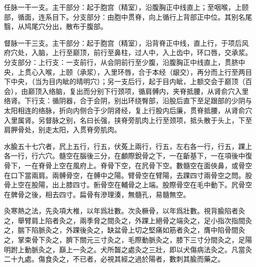 \documentclass[12pt]{ctexbook}%
\begin{document}
任脉一干一支。主干部分：起于胞宫（精室），沿腹胸正中线直上；至咽喉，上颐部，循面，连系目下。分支部分：由胞中贯脊，向上循行上背部正中位。其别名尾翳，从鸠尾穴分出，散布于腹部。

督脉一干三支。主干部分：起于胞宫（精室），沿背脊正中线，直上行，于项后风府穴处，入脑，上行至巅顶，前行至鼻柱，过人中，入上齿中，环口唇，交承浆。分支部分：上行支：一支前行，从会阴前行至少腹，沿腹胸正中线直上，贯脐中央，上贯心入喉，上颐（承浆），入里环唇，合于本经（龈交），再分而上行至两目下中央，（当为目内眦的晴明穴）；另一支后行，起于目内眦，上额交会于巅顶（百会），由巅顶入络脑，复出而分别下行颈项，循肩髆内，夹脊抵腰，从肾俞穴入里络肾。下行支：循阴器，合于会阴，别出环绕臀部，沿股后直下至足跟部的少阴与太阳相连的络脉，折向内侧合于少阴肾经，复上行股内后廉，贯脊抵腰，从肾俞穴入里属肾。另督脉之别，名曰长强，挟脊旁肌肉上行至颈项，抵头散于头上，下至肩胛骨处，别走太阳，入贯脊旁肌肉。


\begin{yuanwen}
水腧五十七穴者，凥上五行，行五，伏菟上兩行，行五，左右各一行，行五，踝上各一行，行六穴。髓空在腦後三分，在顱際銳骨之下，一在齗基下，一在項後中復骨下，一在脊骨上空在風府上。脊骨下空，在凥骨下空。數髓空在面俠鼻，或骨空在口下當兩肩。兩髆骨空，在髆中之陽。臂骨空在臂陽，去踝四寸兩骨空之問。股骨上空在股陽，出上膝四寸。䯒骨空在輔骨之上端。股際骨空在毛中動下。凥骨空在髀骨之後，相去四寸。扁骨有滲理湊，無髓孔，易髓無空。

灸寒熱之法，先灸項大椎，以年爲壯數。次灸橛骨，以年爲壯數。視背腧陷者灸之，舉臂肩上陷者灸之，兩季脅之間灸之，外踝上絕骨之端灸之，足小指次指間灸之，腨下陷脈灸之，外踝後灸之，缺盆骨上切之堅痛如筋者灸之，膺中陷骨間灸之，掌束骨下灸之，臍下關元三寸灸之，毛際動脈灸之，膝下三寸分間灸之，足陽明跗上動脈灸之，巔上一灸之。犬所齧之處灸之三壯，即以犬傷病法灸之。凡當灸二十九處。傷食灸之，不已者，必視其經之過於陽者，數刺其腧而藥之。
\end{yuanwen}

\end{document}
